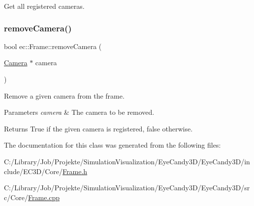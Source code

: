 Get all registered cameras. 

\mbox{\label{classec_1_1_frame_a7a93ec89a809f5b7e685c5adc73d6cda}} 
\subsubsection{\texorpdfstring{remove\+Camera()}{removeCamera()}}
{\footnotesize\ttfamily bool ec\+::\+Frame\+::remove\+Camera (\begin{DoxyParamCaption}\item[{\mbox{\hyperlink{classec_1_1_camera}{Camera}} $\ast$}]{camera }\end{DoxyParamCaption})}



Remove a given camera from the frame. 


\begin{DoxyParams}{Parameters}
{\em camera} & The camera to be removed. \\
\hline
\end{DoxyParams}
\begin{DoxyReturn}{Returns}
True if the given camera is registered, false otherwise. 
\end{DoxyReturn}


The documentation for this class was generated from the following files\+:\begin{DoxyCompactItemize}
\item 
C\+:/\+Library/\+Job/\+Projekte/\+Simulation\+Visualization/\+Eye\+Candy3\+D/\+Eye\+Candy3\+D/include/\+E\+C3\+D/\+Core/\mbox{\hyperlink{_frame_8h}{Frame.\+h}}\item 
C\+:/\+Library/\+Job/\+Projekte/\+Simulation\+Visualization/\+Eye\+Candy3\+D/\+Eye\+Candy3\+D/src/\+Core/\mbox{\hyperlink{_frame_8cpp}{Frame.\+cpp}}\end{DoxyCompactItemize}
